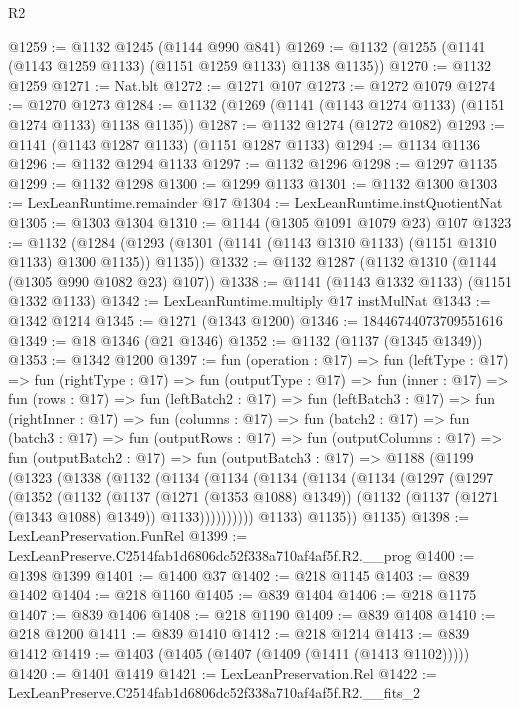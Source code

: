 \begin{lexlean}{R2}
\begin{coremodule}
@1259 := @1132 @1245 (@1144 @990 @841)
@1269 := @1132 (@1255 (@1141 (@1143 @1259 @1133) (@1151 @1259 @1133) @1138 @1135))
@1270 := @1132 @1259
@1271 := Nat.blt
@1272 := @1271 @107
@1273 := @1272 @1079
@1274 := @1270 @1273
@1284 := @1132 (@1269 (@1141 (@1143 @1274 @1133) (@1151 @1274 @1133) @1138 @1135))
@1287 := @1132 @1274 (@1272 @1082)
@1293 := @1141 (@1143 @1287 @1133) (@1151 @1287 @1133)
@1294 := @1134 @1136
@1296 := @1132 @1294 @1133
@1297 := @1132 @1296
@1298 := @1297 @1135
@1299 := @1132 @1298
@1300 := @1299 @1133
@1301 := @1132 @1300
@1303 := LexLeanRuntime.remainder @17
@1304 := LexLeanRuntime.instQuotientNat
@1305 := @1303 @1304
@1310 := @1144 (@1305 @1091 @1079 @23) @107
@1323 := @1132
    (@1284 (@1293 (@1301 (@1141 (@1143 @1310 @1133) (@1151 @1310 @1133) @1300 @1135)) @1135))
@1332 := @1132 @1287 (@1132 @1310 (@1144 (@1305 @990 @1082 @23) @107))
@1338 := @1141 (@1143 @1332 @1133) (@1151 @1332 @1133)
@1342 := LexLeanRuntime.multiply @17 instMulNat
@1343 := @1342 @1214
@1345 := @1271 (@1343 @1200)
@1346 := 18446744073709551616
@1349 := @18 @1346 (@21 @1346)
@1352 := @1132 (@1137 (@1345 @1349))
@1353 := @1342 @1200
@1397 := fun (operation : @17) =>
  fun (leftType : @17) =>
  fun (rightType : @17) =>
  fun (outputType : @17) =>
  fun (inner : @17) =>
  fun (rows : @17) =>
  fun (leftBatch2 : @17) =>
  fun (leftBatch3 : @17) =>
  fun (rightInner : @17) =>
  fun (columns : @17) =>
  fun (batch2 : @17) =>
  fun (batch3 : @17) =>
  fun (outputRows : @17) =>
  fun (outputColumns : @17) =>
  fun (outputBatch2 : @17) =>
  fun (outputBatch3 : @17) =>
  @1188
    (@1199
      (@1323
        (@1338
          (@1132
            (@1134
              (@1134
                (@1134
                  (@1134
                    (@1134
                      (@1297
                        (@1297
                          (@1352
                            (@1132
                              (@1137 (@1271 (@1353 @1088) @1349))
                              (@1132 (@1137 (@1271 (@1343 @1088) @1349)) @1133))))))))))
            @1133)
          @1135))
      @1135)
@1398 := LexLeanPreservation.FunRel
@1399 := LexLeanPreserve.C2514fab1d6806dc52f338a710af4af5f.R2.__prog
@1400 := @1398 @1399
@1401 := @1400 @37
@1402 := @218 @1145
@1403 := @839 @1402
@1404 := @218 @1160
@1405 := @839 @1404
@1406 := @218 @1175
@1407 := @839 @1406
@1408 := @218 @1190
@1409 := @839 @1408
@1410 := @218 @1200
@1411 := @839 @1410
@1412 := @218 @1214
@1413 := @839 @1412
@1419 := @1403 (@1405 (@1407 (@1409 (@1411 (@1413 @1102)))))
@1420 := @1401 @1419
@1421 := LexLeanPreservation.Rel
@1422 := LexLeanPreserve.C2514fab1d6806dc52f338a710af4af5f.R2.__fits_2

\end{coremodule}
\end{lexlean}
